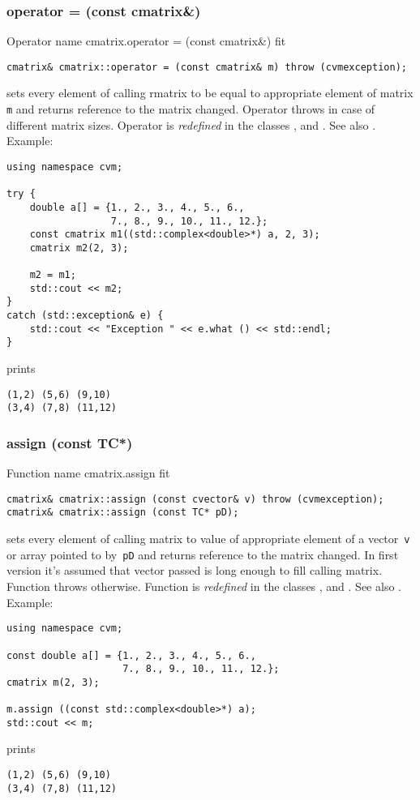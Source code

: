 \subsubsection{operator = (const cmatrix\&)}
Operator%
\pdfdest name {cmatrix.operator = (const cmatrix&)} fit
\begin{verbatim}
cmatrix& cmatrix::operator = (const cmatrix& m) throw (cvmexception);
\end{verbatim}
sets  every element of  calling rmatrix to be equal to
appropriate element of  matrix \verb"m"
and returns  reference to
the matrix changed.
Operator throws  
in case of different matrix sizes.
Operator is \emph{redefined} in the classes
,  
and .
See also .
Example:
\begin{Verbatim}
using namespace cvm;

try {
    double a[] = {1., 2., 3., 4., 5., 6.,
                  7., 8., 9., 10., 11., 12.};
    const cmatrix m1((std::complex<double>*) a, 2, 3);
    cmatrix m2(2, 3);

    m2 = m1;
    std::cout << m2;
}
catch (std::exception& e) {
    std::cout << "Exception " << e.what () << std::endl;
}
\end{Verbatim}
prints
\begin{Verbatim}
(1,2) (5,6) (9,10)
(3,4) (7,8) (11,12)
\end{Verbatim}
\newpage




\subsubsection{assign (const TC*)}
Function%
\pdfdest name {cmatrix.assign} fit
\begin{verbatim}
cmatrix& cmatrix::assign (const cvector& v) throw (cvmexception);
cmatrix& cmatrix::assign (const TC* pD);
\end{verbatim}
sets every element of  calling matrix to  value of
appropriate element of a vector~\verb'v'
or  array pointed to by~\verb"pD"
and returns  reference to
the matrix changed.
In first version it's assumed that vector passed is long
enough to fill calling matrix. Function throws  
otherwise.
Function is \emph{redefined} in the classes
,  
and .
See also .
Example:
\begin{Verbatim}
using namespace cvm;

const double a[] = {1., 2., 3., 4., 5., 6.,
                    7., 8., 9., 10., 11., 12.};
cmatrix m(2, 3);

m.assign ((const std::complex<double>*) a);
std::cout << m;
\end{Verbatim}
prints
\begin{Verbatim}
(1,2) (5,6) (9,10)
(3,4) (7,8) (11,12)
\end{Verbatim}
\newpage




